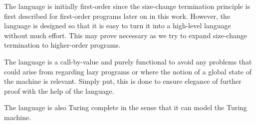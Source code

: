 The language is initially first-order since the size-change termination
principle is first described for first-order programs later on in this work.
However, the language is designed so that it is easy to turn it into a
high-level language without much effort. This may prove necessary as we try to
expand size-change termination to higher-order programs.

The language is a call-by-value and purely functional to avoid any problems
that could arise from regarding lazy programs or where the notion of a global
state of the machine is relevant. Simply put, this is done to ensure elegance
of further proof with the help of the language.

The language \D{} is also Turing complete in the sense that it can model the
Turing machine.








